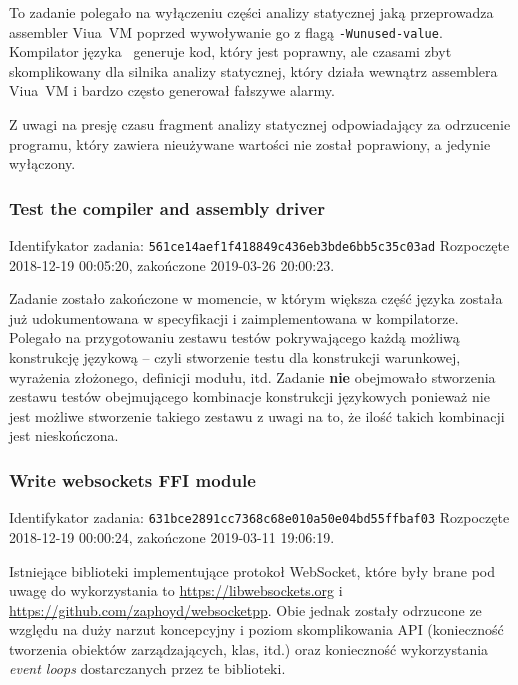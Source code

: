 To zadanie polegało na wyłączeniu części analizy statycznej jaką przeprowadza
assembler Viua~VM poprzed wywoływanie go z flagą \texttt{-Wunused-value}.
Kompilator języka \ViuAct\ generuje kod, który jest poprawny, ale czasami zbyt
skomplikowany dla silnika analizy statycznej, który działa wewnątrz assemblera
Viua~VM i bardzo często generował fałszywe alarmy.

Z uwagi na presję czasu fragment analizy statycznej odpowiadający za odrzucenie
programu, który zawiera nieużywane wartości nie został poprawiony, a jedynie
wyłączony.

\subsubsection{Test the compiler and assembly driver}

Identifykator zadania: \texttt{561ce14aef1f418849c436eb3bde6bb5c35c03ad}
\newline
Rozpoczęte 2018-12-19 00:05:20, zakończone 2019-03-26 20:00:23.
\newline

Zadanie zostało zakończone w momencie, w którym większa część języka została już
udokumentowana w specyfikacji i zaimplementowana w kompilatorze. Polegało na
przygotowaniu zestawu testów pokrywającego każdą możliwą konstrukcję językową --
czyli stworzenie testu dla konstrukcji warunkowej, wyrażenia złożonego,
definicji modułu, itd. Zadanie \textbf{nie} obejmowało stworzenia zestawu testów
obejmującego kombinacje konstrukcji językowych ponieważ nie jest możliwe
stworzenie takiego zestawu z uwagi na to, że ilość takich kombinacji jest
nieskończona.

\subsubsection{Write websockets FFI module}

Identifykator zadania: \texttt{631bce2891cc7368c68e010a50e04bd55ffbaf03}
\newline
Rozpoczęte 2018-12-19 00:00:24, zakończone 2019-03-11 19:06:19.
\newline

Istniejące biblioteki implementujące protokoł WebSocket, które były brane pod
uwagę do wykorzystania to \url{https://libwebsockets.org} i
\url{https://github.com/zaphoyd/websocketpp}. Obie jednak zostały odrzucone ze
względu na duży narzut koncepcyjny i poziom skomplikowania API (konieczność
tworzenia obiektów zarządzających, klas, itd.) oraz konieczność wykorzystania
\emph{event loops} dostarczanych przez te biblioteki.

